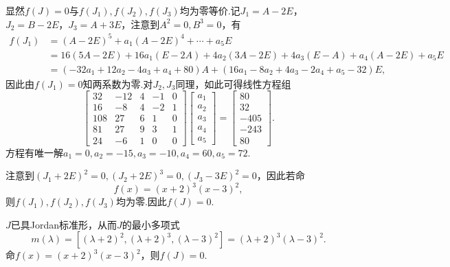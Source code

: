 \begin{sol}[法一]
	显然$f(J)=0$与$f(J_1),f(J_2),f(J_3)$均为零等价.记$J_1=A-2E$，$J_2=B-2E$，$J_3=A+3E$，注意到$A^2=0,B^3=0$，有
	\begin{align*}
		f(J_1) & =(A-2E)^5+a_1(A-2E)^4+\cdots+a_5E                            \\
		       & =16(5A-2E)+16a_1(E-2A)+4a_2(3A-2E)+4a_3(E-A)+a_4(A-2E)+a_5E  \\
		       & =(-32a_1+12a_2-4a_3+a_4+80)A+(16a_1-8a_2+4a_3-2a_4+a_5-32)E,
	\end{align*}
	因此由$f(J_1)=0$知两系数为零.对$J_2,J_3$同理，如此可得线性方程组
	\[
		\begin{bmatrix}
			32  & -12 & 4 & -1 & 0 \\
			16  & -8  & 4 & -2 & 1 \\
			108 & 27  & 6 & 1  & 0 \\
			81  & 27  & 9 & 3  & 1 \\
			24  & -6  & 1 & 0  & 0
		\end{bmatrix}\begin{bmatrix}
			a_1 \\a_2\\a_3\\a_4\\a_5
		\end{bmatrix}=\begin{bmatrix}
			80 \\32\\-405\\-243\\80
		\end{bmatrix}.
	\]
	方程有唯一解$a_1=0,a_2=-15,a_3=-10,a_4=60,a_5=72$.
\end{sol}
\begin{sol}[法二]
	注意到$(J_1+2E)^2=0,(J_2+2E)^3=0,(J_3-3E)^2=0$，因此若命
	\[
		f(x)=(x+2)^3(x-3)^2,
	\]
	则$f(J_1),f(J_2),f(J_3)$均为零.因此$f(J)=0$.
\end{sol}
\begin{sol}[法三]
	$J$已具Jordan标准形，从而$J$的最小多项式
	\[
		m(\lambda)=[(\lambda+2)^2,(\lambda+2)^3,(\lambda-3)^2]=(\lambda+2)^3(\lambda-3)^2.
	\]
	命$f(x)=(x+2)^3(x-3)^2$，则$f(J)=0$.
\end{sol}
